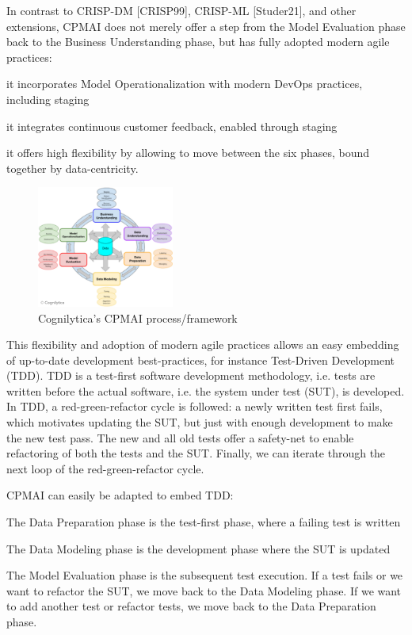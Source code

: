 \documentclass[twocolumn]{article}
\begin{document}
In contrast to CRISP-DM [CRISP99], CRISP-ML [Studer21], and other extensions, CPMAI does not merely offer a step from the Model Evaluation phase back to the Business Understanding phase, but has fully adopted modern agile practices: 
\begin{compactitem}
\item it incorporates Model Operationalization with modern DevOps practices, including staging
\item it integrates continuous customer feedback, enabled through staging
\item it offers high flexibility by allowing to move between the six phases, bound together by data-centricity.
\end{compactitem}

\begin{figure}[hbt!]
  \begin{center}
  \vspace{-4mm}
\includegraphics[width=0.4\textwidth]{figures/cpmai}
  \vspace{-4mm}
\caption{Cognilytica’s CPMAI process/framework}
\label{fig:cpmai}
\end{center}
\end{figure}

This flexibility and adoption of modern agile practices allows an easy embedding of up-to-date development best-practices, for instance Test-Driven Development (TDD). TDD is a test-first software development methodology, i.e. tests are written before the actual software, i.e. the system under test (SUT), is developed. In TDD, a red-green-refactor cycle is followed: a newly written test first fails, which motivates updating the SUT, but just with enough development to make the new test pass. The new and all old tests offer a safety-net to enable refactoring of both the tests and the SUT. Finally, we can iterate through the next loop of the red-green-refactor cycle.

CPMAI can easily be adapted to embed TDD:
\begin{compactitem}
\item The Data Preparation phase is the test-first phase, where a failing test is written
\item The Data Modeling phase is the development phase where the SUT is updated
\item The Model Evaluation phase is the subsequent test execution. If a test fails or we want to refactor the SUT, we move back to the Data Modeling phase. If we want to add another test or refactor tests, we move back to the Data Preparation phase.
\end{compactitem}
\end{document}
